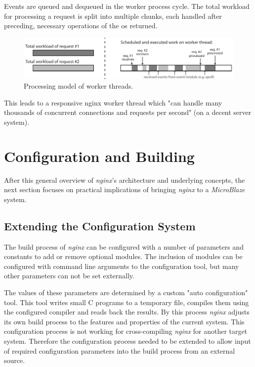Events are queued and dequeued in the worker process cycle. The total workload for processing a request is split into multiple chunks, each handled after preceding, necessary operations of the \gls{os} returned.

\begin{figure}[H]
	\centering
	\includegraphics[scale=1]{images/nginx-event-proc.pdf}
	\caption{Processing model of worker threads.}
	\label{fig:nginx-event-proc}
\end{figure}

This leads to a responsive nginx worker thread which "can handle many thousands of concurrent connections and requests per second" \cite{aosa} (on a decent server system).

\clearpage
\section{Configuration and Building}
\label{sec:nginx-config}

After this general overview of \textit{nginx}'s architecture and underlying concepts, the next section focuses on practical implications of bringing \textit{nginx} to a \textit{MicroBlaze} system.
\\

\subsection{Extending the Configuration System}

The build process of \textit{nginx} can be configured with a number of parameters and constants to add or remove optional modules. The inclusion of modules can be configured with command line arguments to the configuration tool, but many other parameters can not be set externally.

The values of these parameters are determined by a custom "auto configuration" tool. This tool writes small C programs to a temporary file, compiles them using the configured compiler and reads back the results. By this process \textit{nginx} adjusts its own build process to the features and properties of the current system. This configuration process is not working for cross-compiling \textit{nginx} for another target system. Therefore the configuration process needed to be extended to allow input of required configuration parameters into the build process from an external source.

